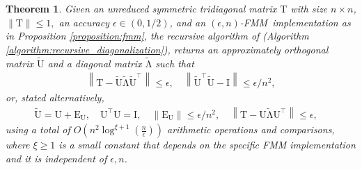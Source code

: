 \documentclass{article}
\newcommand{\lnorm}{\left\|}
\newcommand{\rnorm}{\right\|}
\newcommand{\lpar}{\left(}
\newcommand{\rpar}{\right)}
\newtheorem{theorem}{Theorem}[section]
\newcommand\matE{\boldsymbol{\mathrm{E}}}
\newcommand\matI{\boldsymbol{\mathrm{I}}}
\newcommand\matT{\boldsymbol{\mathrm{T}}}
\newcommand\matU{\boldsymbol{\mathrm{U}}}
\newcommand\matUtilde{\widetilde{\boldsymbol{\mathrm{U}}}}
\newcommand\matLambdatilde{\widetilde{\boldsymbol{\mathrm{\Lambda}}}}
\newcommand{\cfmm}{\xi}
\newcommand{\fmmalgo}{FMM} \usepackage[utf8]{inputenc}
\begin{document}
\begin{theorem}
    \label{theorem:alg_recursive_diagonalization}
    Given an unreduced symmetric tridiagonal matrix $\matT$ with size $n\times n$, $\|\matT\|\leq 1,$ an accuracy $\epsilon\in(0,1/2)$, and an $(\epsilon,n)$-\fmmalgo\   implementation as in Proposition \ref{proposition:fmm},  the recursive algorithm of \cite{gu1995divide} (Algorithm \ref{algorithm:recursive_diagonalization}), returns an approximately orthogonal matrix $\matUtilde$ and a diagonal matrix $\matLambdatilde$ such that
    \begin{align*}
        \lnorm \matT - \matUtilde\matLambdatilde\matUtilde^\top \rnorm \leq \epsilon,
        \quad
        \lnorm \matUtilde^\top \matUtilde - \matI \rnorm \leq \epsilon/n^2,
    \end{align*}
    or, stated alternatively,
    \begin{align*}
        \matUtilde=\matU+\matE_{\matU},
        \quad
        \matU^\top\matU=\matI,
        \quad
        \lnorm \matE_{\matU} \rnorm \leq \epsilon/n^2,
        \quad
        \lnorm \matT - \matU\matLambdatilde\matU^\top \rnorm \leq \epsilon,
        \quad
    \end{align*}
    using a total of $O\lpar n^2\log^{\cfmm+1}(\tfrac{n}{\epsilon})\rpar$ arithmetic operations and comparisons, where $\xi\geq 1$ is a small constant that depends on the specific FMM implementation and it is independent of $\epsilon,n$.
   
\end{theorem}
\end{document}
